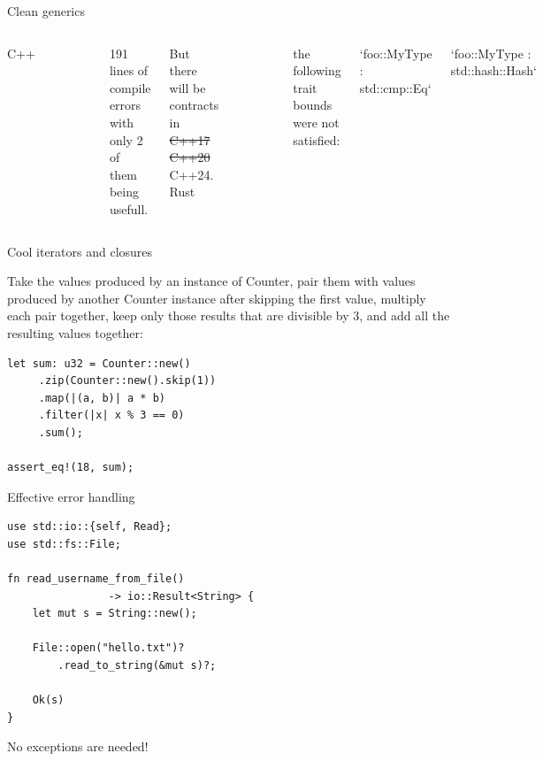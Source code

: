 \documentclass{beamer}
\begin{document}
    \begin{frame}[fragile]{Clean generics}
        \vfill
        \begin{columns}
            C++
            \vfill
            \noindent\rule{\textwidth}{1pt}
            \large{
                \begin{verbatim}
class MyType {};
unordered_set<MyType>;
                \end{verbatim}
            }
            \noindent\rule{\textwidth}{1pt}
            \vfill
            191 lines of compile errors with only 2 of them being usefull.

            But there will be contracts in \st{C++17} \st{C++20} C++24.
            Rust
            \vfill
            \noindent\rule{\textwidth}{1pt}
            \large{
                \begin{verbatim}
struct MyType;
HashSet::<MyType>::new();
                \end{verbatim}
            }
            \noindent\rule{\textwidth}{1pt}
            \vfill
            the following trait bounds were not satisfied:

            \small{
                `foo::MyType : std::cmp::Eq`

                `foo::MyType : std::hash::Hash`
            }
        \end{columns}
    \end{frame}

    \begin{frame}[fragile]{Cool iterators and closures}

        Take the values produced by an instance of Counter,
        pair them with values produced by another Counter instance
        after skipping the first value, multiply each pair together,
        keep only those results that are divisible by 3,
        and add all the resulting values together:

        \large\begin{verbatim}
let sum: u32 = Counter::new()
     .zip(Counter::new().skip(1))
     .map(|(a, b)| a * b)
     .filter(|x| x % 3 == 0)
     .sum();

assert_eq!(18, sum);
        \end{verbatim}

    \end{frame}

    \begin{frame}[fragile]{Effective error handling}

        \large\begin{verbatim}
use std::io::{self, Read};
use std::fs::File;

fn read_username_from_file()
                -> io::Result<String> {
    let mut s = String::new();

    File::open("hello.txt")?
        .read_to_string(&mut s)?;

    Ok(s)
}
        \end{verbatim}
    No exceptions are needed!

    \end{frame}
\end{document}
